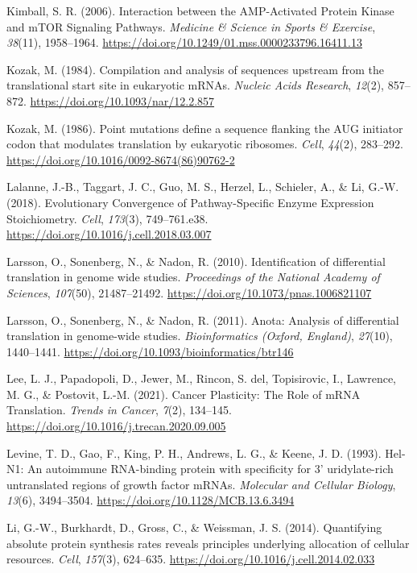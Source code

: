 \documentclass[12pt,openany]{book}
\begin{document}
\hypertarget{ref-Kimball2006}{}
Kimball, S. R. (2006). Interaction between the AMP-Activated Protein
Kinase and mTOR Signaling Pathways. \emph{Medicine \& Science in Sports
\& Exercise}, \emph{38}(11), 1958--1964.
\url{https://doi.org/10.1249/01.mss.0000233796.16411.13}

\hypertarget{ref-Kozak1984}{}
Kozak, M. (1984). Compilation and analysis of sequences upstream from
the translational start site in eukaryotic mRNAs. \emph{Nucleic Acids
Research}, \emph{12}(2), 857--872.
\url{https://doi.org/10.1093/nar/12.2.857}

\hypertarget{ref-Kozak1986}{}
Kozak, M. (1986). Point mutations define a sequence flanking the AUG
initiator codon that modulates translation by eukaryotic ribosomes.
\emph{Cell}, \emph{44}(2), 283--292.
\url{https://doi.org/10.1016/0092-8674(86)90762-2}

\hypertarget{ref-Lalanne2018}{}
Lalanne, J.-B., Taggart, J. C., Guo, M. S., Herzel, L., Schieler, A., \&
Li, G.-W. (2018). Evolutionary Convergence of Pathway-Specific Enzyme
Expression Stoichiometry. \emph{Cell}, \emph{173}(3), 749--761.e38.
\url{https://doi.org/10.1016/j.cell.2018.03.007}

\hypertarget{ref-Larsson2010}{}
Larsson, O., Sonenberg, N., \& Nadon, R. (2010). Identification of
differential translation in genome wide studies. \emph{Proceedings of
the National Academy of Sciences}, \emph{107}(50), 21487--21492.
\url{https://doi.org/10.1073/pnas.1006821107}

\hypertarget{ref-Larsson2011}{}
Larsson, O., Sonenberg, N., \& Nadon, R. (2011). Anota: Analysis of
differential translation in genome-wide studies. \emph{Bioinformatics
(Oxford, England)}, \emph{27}(10), 1440--1441.
\url{https://doi.org/10.1093/bioinformatics/btr146}

\hypertarget{ref-Lee2021}{}
Lee, L. J., Papadopoli, D., Jewer, M., Rincon, S. del, Topisirovic, I.,
Lawrence, M. G., \& Postovit, L.-M. (2021). Cancer Plasticity: The Role
of mRNA Translation. \emph{Trends in Cancer}, \emph{7}(2), 134--145.
\url{https://doi.org/10.1016/j.trecan.2020.09.005}

\hypertarget{ref-Levine1993}{}
Levine, T. D., Gao, F., King, P. H., Andrews, L. G., \& Keene, J. D.
(1993). Hel-N1: An autoimmune RNA-binding protein with specificity for
3' uridylate-rich untranslated regions of growth factor mRNAs.
\emph{Molecular and Cellular Biology}, \emph{13}(6), 3494--3504.
\url{https://doi.org/10.1128/MCB.13.6.3494}

\hypertarget{ref-Li2014}{}
Li, G.-W., Burkhardt, D., Gross, C., \& Weissman, J. S. (2014).
Quantifying absolute protein synthesis rates reveals principles
underlying allocation of cellular resources. \emph{Cell}, \emph{157}(3),
624--635. \url{https://doi.org/10.1016/j.cell.2014.02.033}
\end{document}
